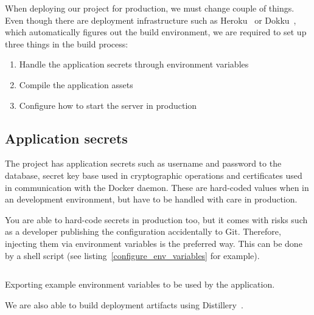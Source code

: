 When deploying our project for production, we must change couple of things. Even though there are deployment infrastructure such as Heroku~\cite{CloudHeroku} or Dokku~\cite{DokkuSeen}, which automatically figures out the build environment, we are required to set up three things in the build process:

\begin{enumerate}
    \item Handle the application secrets through environment variables
    \item Compile the application assets
    \item Configure how to start the server in production
\end{enumerate}

\subsection{Application secrets}

The project has application secrets such as username and password to the database, secret key base used in cryptographic operations and certificates used in communication with the Docker daemon. These are hard-coded values when in an development environment, but have to be handled with care in production.

You are able to hard-code secrets in production too, but it comes with risks such as a developer publishing the configuration accidentally to Git. Therefore, injecting them via environment variables is the preferred way. This can be done by a shell script (see listing~\ref{configure_env_variables} for example).

\begin{listing}
    \inputminted{bash}{code/env.sh}
    \caption{Exporting example environment variables to be used by the application.}
    \label{configure_env_variables}
\end{listing}

We are also able to build deployment artifacts using Distillery~\cite{HomeDocumentation}.

